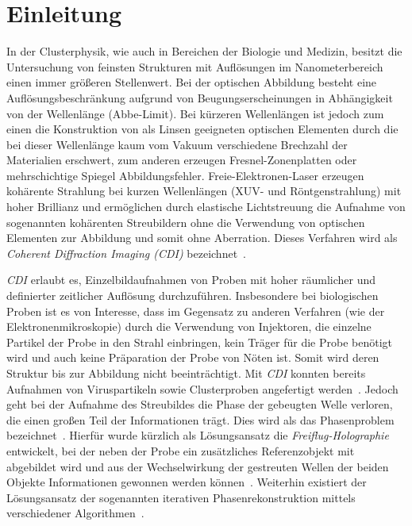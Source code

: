 \chapter{Einleitung}
In der Clusterphysik, wie auch in Bereichen der Biologie und Medizin, besitzt die Untersuchung von feinsten Strukturen mit Auflösungen im Nanometerbereich einen immer größeren Stellenwert. Bei der optischen Abbildung besteht eine Auflösungsbeschränkung aufgrund von Beugungserscheinungen in Abhängigkeit von der Wellenlänge (Abbe-Limit). Bei kürzeren Wellenlängen ist jedoch zum einen die Konstruktion von als Linsen geeigneten optischen Elementen durch die bei dieser Wellenlänge kaum vom Vakuum verschiedene Brechzahl der Materialien erschwert, zum anderen erzeugen Fresnel-Zonenplatten oder mehrschichtige Spiegel Abbildungsfehler. Freie-Elektronen-Laser erzeugen kohärente Strahlung bei kurzen Wellenlängen (XUV- und Röntgenstrahlung) mit hoher Brillianz und ermöglichen durch elastische Lichtstreuung die Aufnahme von sogenannten kohärenten Streubildern ohne die Verwendung von optischen Elementen zur Abbildung und somit ohne Aberration. Dieses Verfahren wird als \textit{Coherent Diffraction Imaging (CDI)} bezeichnet~\cite{schultz2013chapter7}.

\textit{CDI} erlaubt es, Einzelbildaufnahmen von Proben mit hoher räumlicher und definierter zeitlicher Auflösung durchzuführen. Insbesondere bei biologischen Proben ist es von Interesse, dass im Gegensatz zu anderen Verfahren (wie der Elektronenmikroskopie) durch die Verwendung von Injektoren, die einzelne Partikel der Probe in den Strahl einbringen, kein Träger für die Probe benötigt wird und auch keine Präparation der Probe von Nöten ist. Somit wird deren Struktur bis zur Abbildung nicht beeinträchtigt. Mit \textit{CDI} konnten bereits Aufnahmen von Viruspartikeln sowie Clusterproben angefertigt werden~\cite{seibert2011,barke2015}. Jedoch geht bei der Aufnahme des Streubildes die Phase der gebeugten Welle verloren, die einen großen Teil der Informationen trägt. Dies wird als das Phasenproblem bezeichnet~\cite{shechtman2015}. Hierfür wurde kürzlich als Lösungsansatz die \textit{Freiflug-Holographie} entwickelt, bei der neben der Probe ein zusätzliches Referenzobjekt mit abgebildet wird und aus der Wechselwirkung der gestreuten Wellen der beiden Objekte Informationen gewonnen werden können~\cite{gorkhover2016}. Weiterhin existiert der Lösungsansatz der sogenannten iterativen Phasenrekonstruktion mittels verschiedener Algorithmen~\cite{marchesini2007}. 

